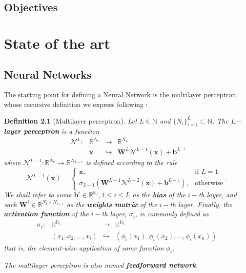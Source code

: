 \documentclass[12pt]{report} %
\newtheorem{definition}{Definition}
\newcommand{\tmmathbf}[1]{\ensuremath{\boldsymbol{#1}}}
\begin{document}
\section{Objectives}

\chapter{State of the art}
\section{Neural Networks} \label{sec-neural-networks}
The starting point for defining a Neural Network is the multilayer perceptron, whose recursive definition we express following \cite{lu2021deepxde}:
\begin{definition}[Multilayer perceptron]
  Let \(L \in \mathbb{N}\) and \(\{ N_i \}_{i = 1}^L \subset \mathbb{N}\). The
  {\textbf{$L-$layer perceptron}} is a function
  \begin{equation}
      \begin{array}{llll}
       \mathcal{N}^L : & \mathbb{R}^{N_0} & \rightarrow & \mathbb{R}^{N_L}\\
       & \tmmathbf{x} & \hookrightarrow & \tmmathbf{W}^L \mathcal{N}^{L - 1}
       (\tmmathbf{x}) +\tmmathbf{b}^L
     \end{array},
     \label{perceptronRule}
  \end{equation}
  where \(\mathcal{N}^{L - 1} : \mathbb{R}^{N_0} \rightarrow \mathbb{R}^{N_{L- 1}}\) is defined according to the rule
  \[ \mathcal{N}^{L - 1} (\tmmathbf{x}) = \left\{\begin{array}{ll}
       \tmmathbf{x}, & \text{if } L = 1\\
       \sigma_{L - 1} (\tmmathbf{W}^{L - 1} \mathcal{N}^{L - 2} (\tmmathbf{x})
       +\tmmathbf{b}^{L - 1}), & \text{otherwise}
     \end{array}\right. . \]
  We shall refer to some \(\tmmathbf{b}^i \in \mathbb{R}^{\mathbb{N}_i}, 1 \leq i \leq L\) as the {\textbf{bias}} of the \(i -\)th layer, and each
  \(\tmmathbf{W}^i \in \mathbb{R}^{N_i \times N_{i - 1}}\) as the
  \textbf{weights matrix} of the \(i -\)th layer. Finally, the \textbf{activation function} of the $i
  -$th layer, \(\sigma_i\), is commonly defined as
  \[ \begin{array}{cccc}
       \sigma_i : & \mathbb{R}^{\mathbb{N}_i} & \rightarrow &
       \mathbb{R}^{\mathbb{N}_i}\\
       & (x_1, x_2, \ldots, x_i) & \hookrightarrow & (\phi_i (x_1), \phi_i (x_2),
       \ldots, \phi_i (x_n))
     \end{array} \]
  that is, the element-wise application of some function
  $\phi_i$.

  The multilayer perceptron is also named \textbf{feedforward network}.
\end{definition}
\end{document}
